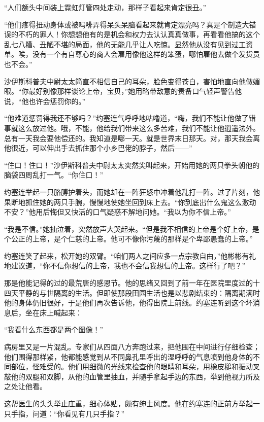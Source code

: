     “人们额头中间装上霓虹灯管四处走动，那样子看起来肯定很丑。”

    “他们疼得扭动身体或被吗啡弄得呆头呆脑看起来就肯定漂亮吗？真是个制造大错误的不朽的罪人！你想想他有的是机会和权力去认认真真做事，再看看他搞的这个乱七八糟、丑陋不堪的局面，他的无能几乎让人吃惊。显然他从没有见到过工资单。唉，没有一个有自尊心的商人会雇用像他这样的笨蛋，哪怕雇他去做个发货员也不会。”

    沙伊斯科普夫中尉太太简直不相信自己的耳朵，脸色变得苍白，害怕地直向他做媚眼。“你最好别像那样谈论上帝，宝贝，”她用略带敌意的责备口气轻声警告他说，“他也许会惩罚你的。”

    “他难道惩罚得我还不够吗？”约塞连气呼呼地咕噜道，“嗨，我们不能让他做了错事就这么放过他。哦，不能，他给我们带来这么多苦难，我们不能让他逍遥法外。总有一天我会要他偿还的。我知道是哪一天。就是世界末日那天。对，那天我会离他很近，可以伸出手去抓住那个小乡巴佬的脖子，然后——”

    “住口！住口！”沙伊斯科普夫中尉太太突然尖叫起来，开始用她的两只拳头朝他的脑袋四周乱打一气。“你住口！”
 


    约塞连举起一只胳膊护着头，而她却在一阵狂怒中冲着他乱打一阵。过了片刻，他果断地抓住她的两只手腕，慢慢地使她坐回到床上去。“你到底出什么鬼这么激动不安？”他用后悔但又快活的口气疑惑不解地问她。“我以为你不信上帝。”

    “我是不信。”她抽泣着，突然放声大哭起来。“但是我不相信的上帝是个好上帝，是个公正的上帝，是个仁慈的上帝。他可不像你污蔑的那样是个卑鄙愚蠢的上帝。”

    约塞连笑了起来，松开她的双臂。“咱们两人之间应多一点宗教自由，”他彬彬有礼地建议道，“你不信你想信的上帝，我也不会信我想信的上帝。这样行了吧？”

    那是他能记得的过的最荒唐的感恩节。他的思绪又回到了前一年在医院里度过的十四天平静的与世隔离的生活。但即使那段田园生活也是以悲剧结束的：隔离期满时他的身体仍旧很好，于是他们再次告诉他，他得出院上前线。约塞连听到这个坏消息后，坐在床上喊起来：

    “我看什么东西都是两个图像！”

    病房里又是一片混乱。专家们从四面八方奔跑过来，把他围在中间进行仔细检查；他们围得那样紧，他都能感觉到从不同鼻孔里呼出的湿呼呼的气息喷到他身体的不同部位，怪难受的。他们用细微的光线来检查他的眼睛和耳朵，用橡皮槌和振动叉敲他的双腿和双脚，从他的血管里抽血，并随手拿起手边的东西，举到他视力所及之处让他看。

    这帮医生的头头举止庄重，细心体贴，颇有绅士风度。他在约塞连的正前方举起一只手指，问道：“你看见有几只手指？”

